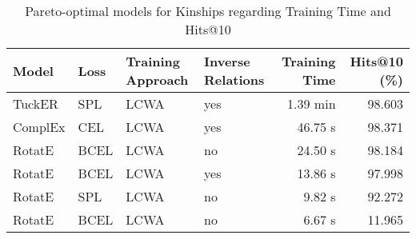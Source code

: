 \begin{table}[H]
\centering
\caption{Pareto-optimal models for Kinships regarding Training Time and Hits@10}
\label{tab:skyline_kinships_training_time}
\begin{tabular}{llllrr}
\toprule
  Model & Loss & Training Approach & Inverse Relations & Training Time &  Hits@10 (\%) \\
\midrule
 TuckER &  SPL &              LCWA &               yes &      1.39 min &       98.603 \\
ComplEx &  CEL &              LCWA &               yes &       46.75 s &       98.371 \\
 RotatE & BCEL &              LCWA &                no &       24.50 s &       98.184 \\
 RotatE & BCEL &              LCWA &               yes &       13.86 s &       97.998 \\
 RotatE &  SPL &              LCWA &                no &        9.82 s &       92.272 \\
 RotatE & BCEL &              LCWA &                no &        6.67 s &       11.965 \\
\bottomrule
\end{tabular}
\end{table}

